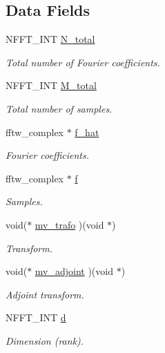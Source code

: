 \subsection*{Data Fields}
\begin{DoxyCompactItemize}
\item 
N\-F\-F\-T\-\_\-\-I\-N\-T \hyperlink{structnfft__plan_a36c570febbf29ba02df8195b634b12bb}{N\-\_\-total}
\begin{DoxyCompactList}\small\item\em Total number of Fourier coefficients. \end{DoxyCompactList}\item 
N\-F\-F\-T\-\_\-\-I\-N\-T \hyperlink{structnfft__plan_aa5ccb2e44937aa98e995e2c33828be03}{M\-\_\-total}
\begin{DoxyCompactList}\small\item\em Total number of samples. \end{DoxyCompactList}\item 
fftw\-\_\-complex $\ast$ \hyperlink{structnfft__plan_a23409aec68871e9a56f11711e2891691}{f\-\_\-hat}
\begin{DoxyCompactList}\small\item\em Fourier coefficients. \end{DoxyCompactList}\item 
fftw\-\_\-complex $\ast$ \hyperlink{structnfft__plan_afa27a166f809acf70ae27e5e6f28daa5}{f}
\begin{DoxyCompactList}\small\item\em Samples. \end{DoxyCompactList}\item 
void($\ast$ \hyperlink{structnfft__plan_a9ebd66f2964cca6a02fc50d640df3557}{mv\-\_\-trafo} )(void $\ast$)
\begin{DoxyCompactList}\small\item\em Transform. \end{DoxyCompactList}\item 
void($\ast$ \hyperlink{structnfft__plan_abbe724645c96ef34c3e98d821f6648a3}{mv\-\_\-adjoint} )(void $\ast$)
\begin{DoxyCompactList}\small\item\em Adjoint transform. \end{DoxyCompactList}\item 
N\-F\-F\-T\-\_\-\-I\-N\-T \hyperlink{structnfft__plan_af313a7301847950b184e7eaa336c2535}{d}
\begin{DoxyCompactList}\small\item\em Dimension (rank). \end{DoxyCompactList}\item 

\end{DoxyCompactItemize}
